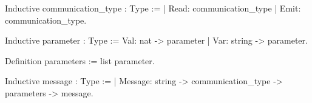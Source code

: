 Inductive communication_type : Type :=
  | Read:  communication_type
  | Emit:  communication_type.

Inductive parameter : Type :=
   Val: nat   -> parameter
 | Var: string -> parameter.

Definition parameters := list parameter.

Inductive message : Type := 
  | Message: string -> communication_type -> parameters -> message.
